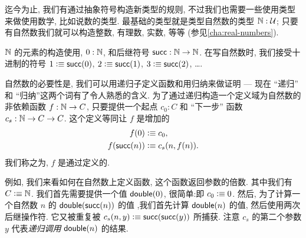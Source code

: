 %
%
%
迄今为止, 我们有通过抽象符号构造新类型的规则, 不过我们也需要一些使用类型来做使用数学, 比如说数的类型. 最基础的类型就是类型自然数的类型 $\mathbb{N} : \mathcal{U}$; 只要有自然数我们就可以构造整数, 有理数, 实数, 等等 (参见\cref{cha:real-numbers}). 

$\mathbb{N}$ 的元素的构造使用, $0 : \mathbb{N}$, 和后继符号 $\mathsf{succ} : \mathbb{N} \to \mathbb{N}$. 在写自然数时, 我们接受十进制的符号 $1 \vcentcolon\equiv \mathsf{succ}(0)$, $2 \vcentcolon\equiv \mathsf{succ}(1)$, $3 \vcentcolon\equiv \mathsf{succ}(2)$, \dots. 

自然数的必要性是, 我们可以用递归子定义函数和用归纳来做证明 --- 现在 ``递归'' 和 ``归纳''这两个词有了令人熟悉的含义. %
为了通过递归构造一个定义域为自然数的非依赖函数 $f : \mathbb{N} \to C$, 只要提供一个起点 $c_0 : C$ 和 ``下一步'' 函数 $c_s : \mathbb{N} \to C \to C$. 这个定义等同让 $f$ 是增加的 \begin{align*}
f(0) &\vcentcolon\equiv c_0, \\
f(\mathsf{succ}(n)) &\vcentcolon\equiv c_s(n,f(n)).
\end{align*}
我们称之为,  $f$ 是通过定义的. %
%

例如, 我们来看如何在自然数上定义函数, 这个函数返回参数的倍数. 其中我们有 $C\vcentcolon\equiv \mathbb{N}$. 我们首先需要提供一个值 $\mathsf{double}(0)$, 很简单:即 $c_0 \vcentcolon\equiv 0$. 然后, 为了计算一个自然数 $n$ 的 $\mathsf{double}(\mathsf{succ}(n))$ 的值 ,我们首先计算 $\mathsf{double}(n)$ 的值, 然后使用两次后继操作符. 它又被重复被 $c_s(n,y) \vcentcolon\equiv \mathsf{succ}(\mathsf{succ}(y))$ 所捕获. 注意 $c_s$ 的第二个参数 $y$ 代表\emph{递归调用} $\mathsf{double}(n)$ 的结果. 

